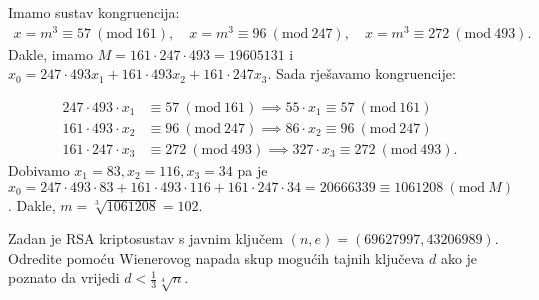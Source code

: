 \documentclass{exam}
\newcommand{\Mod}[1]{\ (\mathrm{mod}\ #1)}
\begin{document}
\begin{questions}
\begin{solution}
  Imamo sustav kongruencija:
  \begin{align*}
    x = m^3 \equiv 57 \Mod{161}, \quad x = m^3 \equiv 96 \Mod{247}, \quad x = m^3 \equiv 272 \Mod{493}.
  \end{align*}
  Dakle, imamo $M = 161 \cdot 247 \cdot 493 = 19605131$ i $x_0 = 247 \cdot 493 x_1 + 161 \cdot 493 x_2 + 161 \cdot 247 x_3$.
  Sada rješavamo kongruencije:

  \begin{align*}
    247 \cdot 493 \cdot x_1 &\equiv 57 \Mod{161} \implies 55 \cdot x_1 \equiv 57 \Mod{161}\\
    161 \cdot 493 \cdot x_2 &\equiv 96 \Mod{247} \implies 86 \cdot x_2 \equiv 96 \Mod{247}\\
    161 \cdot 247 \cdot x_3 &\equiv 272 \Mod{493} \implies 327 \cdot x_3 \equiv 272 \Mod{493}.
  \end{align*}
  Dobivamo $x_1 = 83, x_2 = 116, x_3 = 34$ pa je $x_0 = 247 \cdot 493 \cdot 83 + 161 \cdot 493 \cdot 116 + 161 \cdot 247 \cdot 34 = 20666339 \equiv 1061208 \Mod{M}$. Dakle, $m = \sqrt[3]{1061208} = 102$.
\end{solution}

\pagebreak

\question Zadan je RSA kriptosustav s javnim ključem $(n, e) = (69627997, 43206989)$. Odredite pomoću Wienerovog napada skup mogućih tajnih ključeva $d$ ako je poznato da vrijedi $d < \frac{1}{3} \sqrt[4]{n}$.


\end{questions}
\end{document}
